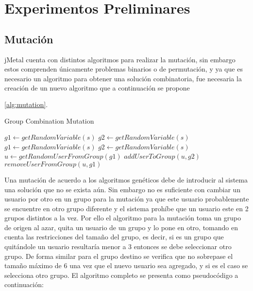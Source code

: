 \chapter{Experimentos Preliminares}
\label{chapter:chapter04}

\section{Mutación}

jMetal cuenta con distintos algoritmos para realizar la mutación, sin embargo estos comprenden únicamente problemas binarios o de permutación, y ya que es necesario un algoritmo para obtener una solución combinatoria, fue necesaria la creación de un nuevo algoritmo que a continuación se propone

\ref{alg:mutation}.
\begin{algorithm}
\caption{Group Combination Mutation}\label{alg:mutation}
\begin{algorithmic}[1]
\State $g1\gets getRandomVariable(s)$
\State $g2\gets getRandomVariable(s)$
\State $g1 \gets getRandomVariable(s)$
\EndWhile\label{euclidendwhile}
\State $g2 \gets getRandomVariable(s)$
\EndWhile\label{euclidendwhile}
\State $u \gets getRandomUserFromGroup(g1)$ 
\State $addUserToGroup(u,g2)$
\State $removeUserFromGroup(u,g1)$
\EndProcedure
\end{algorithmic}
\end{algorithm}

Una mutación de acuerdo a los algoritmos genéticos debe de introducir al sistema una solución que no se exista aún. Sin embargo no es suficiente con cambiar un usuario por otro en un grupo para la mutación ya que este usuario probablemente se encuentre en otro grupo diferente y el sistema prohíbe que un usuario este en 2 grupos distintos a la vez. Por ello el algoritmo para la mutación toma un grupo de origen al azar, quita un usuario de un grupo y lo pone en otro, tomando en cuenta las restricciones del tamaño del grupo, es decir, si es un grupo que quitándole un usuario resultaría menor a 3 entonces se debe seleccionar otro grupo. De forma similar para el grupo destino se verifica que no sobrepase el tamaño máximo de 6 una vez que el nuevo usuario sea agregado, y si es el caso se selecciona otro grupo. El algoritmo completo se presenta como pseudocódigo a continuación:

